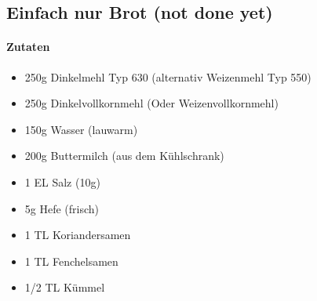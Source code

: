 \newpage
\subsection{Einfach nur Brot (not done yet)}
\paragraph{Zutaten}
\begin{itemize}[noitemsep]
	\item 250g Dinkelmehl Typ 630 (alternativ Weizenmehl Typ 550)
	\item 250g Dinkelvollkornmehl (Oder Weizenvollkornmehl)
	\item 150g Wasser (lauwarm)
	\item 200g Buttermilch (aus dem Kühlschrank)
	\item 1 EL Salz (10g)
	\item 5g Hefe (frisch)
	\vspace{0.5cm}
	\item 1 TL Koriandersamen
	\item 1 TL Fenchelsamen
	\item 1/2 TL Kümmel
\end{itemize}
